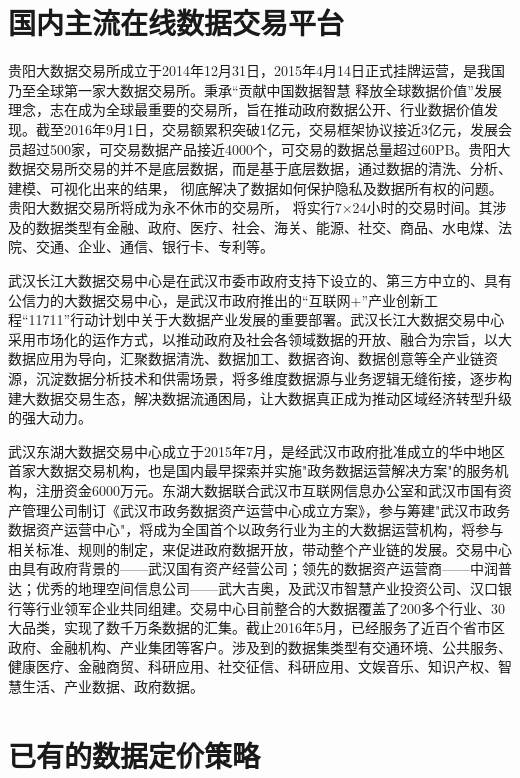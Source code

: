 \section{国内主流在线数据交易平台}

贵阳大数据交易所\cite{gbdex}成立于2014年12月31日，2015年4月14日正式挂牌运营，是我国乃至全球第一家大数据交易所。秉承“贡献中国数据智慧 释放全球数据价值”发展理念，志在成为全球最重要的交易所，旨在推动政府数据公开、行业数据价值发现。截至2016年9月1日，交易额累积突破1亿元，交易框架协议接近3亿元，发展会员超过500家，可交易数据产品接近4000个，可交易的数据总量超过60PB。贵阳大数据交易所交易的并不是底层数据，而是基于底层数据，通过数据的清洗、分析、建模、可视化出来的结果， 彻底解决了数据如何保护隐私及数据所有权的问题。 贵阳大数据交易所将成为永不休市的交易所， 将实行7×24小时的交易时间。其涉及的数据类型有金融、政府、医疗、社会、海关、能源、社交、商品、水电煤、法院、交通、企业、通信、银行卡、专利等。

武汉长江大数据交易中心是在武汉市委市政府支持下设立的、第三方中立的、具有公信力的大数据交易中心，是武汉市政府推出的“互联网+”产业创新工程“11711”行动计划中关于大数据产业发展的重要部署。武汉长江大数据交易中心采用市场化的运作方式，以推动政府及社会各领域数据的开放、融合为宗旨，以大数据应用为导向，汇聚数据清洗、数据加工、数据咨询、数据创意等全产业链资源，沉淀数据分析技术和供需场景，将多维度数据源与业务逻辑无缝衔接，逐步构建大数据交易生态，解决数据流通困局，让大数据真正成为推动区域经济转型升级的强大动力。

武汉东湖大数据交易中心\cite{chinadatatrading}成立于2015年7月，是经武汉市政府批准成立的华中地区首家大数据交易机构，也是国内最早探索并实施"政务数据运营解决方案"的服务机构，注册资金6000万元。东湖大数据联合武汉市互联网信息办公室和武汉市国有资产管理公司制订《武汉市政务数据资产运营中心成立方案》，参与筹建"武汉市政务数据资产运营中心"，将成为全国首个以政务行业为主的大数据运营机构，将参与相关标准、规则的制定，来促进政府数据开放，带动整个产业链的发展。交易中心由具有政府背景的——武汉国有资产经营公司；领先的数据资产运营商——中润普达；优秀的地理空间信息公司——武大吉奥，及武汉市智慧产业投资公司、汉口银行等行业领军企业共同组建。交易中心目前整合的大数据覆盖了200多个行业、30大品类，实现了数千万条数据的汇集。截止2016年5月，已经服务了近百个省市区政府、金融机构、产业集团等客户。涉及到的数据集类型有交通环境、公共服务、健康医疗、金融商贸、科研应用、社交征信、科研应用、文娱音乐、知识产权、智慧生活、产业数据、政府数据。


\section{已有的数据定价策略}

